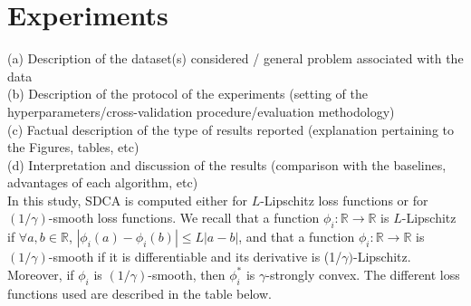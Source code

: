 \documentclass{article}
\newcommand{\abs}[1]{\left|#1\right|}
\begin{document}
\newpage

\section{Experiments}
(a) Description of the dataset(s) considered / general problem associated with the data \\
(b) Description of the protocol of the experiments (setting of the hyperparameters/cross-validation
procedure/evaluation methodology) \\
(c) Factual description of the type of results reported (explanation pertaining to the Figures, tables, etc) \\
(d) Interpretation and discussion of the results (comparison with the baselines, advantages of each
algorithm, etc) \\

In this study, SDCA is computed either for $L$-Lipschitz loss functions or for $(1/\gamma)$-smooth loss functions.
We recall that a function $\phi_i : \mathbb{R} \rightarrow \mathbb{R}$ is $L$-Lipschitz if $\forall a,b \in \mathbb{R}$, $\abs{\phi_i(a)-\phi_i(b)} \leq L \abs{a-b}$, and that a function $\phi_i : \mathbb{R} \rightarrow \mathbb{R}$ is $(1/\gamma)$-smooth if it is differentiable and its derivative is (1/$\gamma)$-Lipschitz.
Moreover, if $\phi_i$ is $(1/\gamma)$-smooth, then $\phi_i^{*}$ is $\gamma$-strongly convex.
The different loss functions used are described in the table below.
\end{document}
